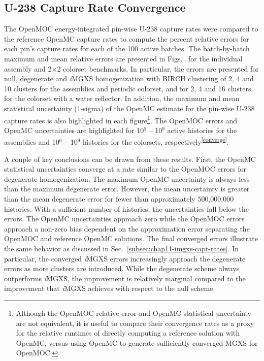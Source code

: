 \subsection{U-238 Capture Rate Convergence}
\label{subsec:chap11-capture-converge}

The OpenMOC energy-integrated pin-wise U-238 capture rates were compared to the reference OpenMC capture rates to compute the percent relative errors for each pin's capture rates for each of the 100 active batches. The batch-by-batch maximum and mean relative errors are presented in Figs.~ for the individual assembly and 2$\times$2 colorset benchmarks. In particular, the errors are presented for null, degenerate and \textit{i}\ac{MGXS} homogenization with BIRCH clustering of 2, 4 and 10 clusters for the assemblies and periodic colorset, and for 2, 4 and 16 clusters for the colorset with a water reflector. In addition, the maximum and mean statistical uncertainty (1-sigma) of the OpenMC estimate for the pin-wise U-238 capture rates is also highlighted in each figure\footnote{Although the OpenMOC relative error and OpenMC statistical uncertainty are not equivalent, it is useful to compare their convergence rates as a proxy for the relative runtimes of directly computing a reference solution with OpenMC, versus using OpenMC to generate sufficiently converged \ac{MGXS} for OpenMOC.}. The OpenMOC errors and OpenMC uncertainties are highlighted for 10$^{5}$ -- 10$^{9}$ active histories for the assemblies and 10$^{6}$ -- 10$^{9}$ histories for the colorsets, respectively\textsuperscript{\ref{converge}}.


A couple of key conclusions can be drawn from these results. First, the OpenMC statistical uncertainties converge at a rate similar to the OpenMOC errors for degenerate homogenization. The maximum OpenMC uncertainty is always less than the maximum degenerate error. However, the mean uncertainty is greater than the mean degenerate error for fewer than approximately 500,000,000 histories. With a sufficient number of histories, the uncertainties fall below the errors. The OpenMC uncertainties approach zero while the OpenMOC errors approach a non-zero bias dependent on the approximation error separating the OpenMOC and reference OpenMC solutions. The final converged errors illustrate the same behavior as discussed in Sec.~\ref{subsec:chap11-imgxs-capt-rates}. In particular, the converged \textit{i}\ac{MGXS} errors increasingly approach the degenerate errors as more clusters are introduced. While the degenerate scheme always outperforms \textit{i}\ac{MGXS}, the improvement is relatively marginal compared to the improvement that \textit{i}\ac{MGXS} achieves with respect to the null scheme.

